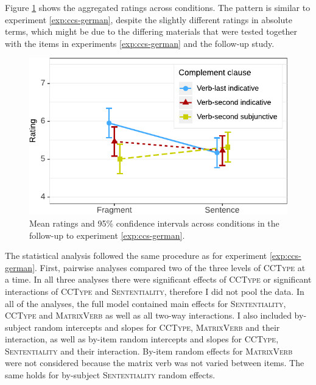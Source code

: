 Figure \ref{fig:ccs-german-short-estimates} shows the aggregated ratings across conditions. The pattern is similar to experiment \ref{exp:ccs-german}, despite the slightly different ratings in absolute terms, which might be due to the differing materials that were tested together with the items in experiments \ref{exp:ccs-german} and the follow-up study.\largerpage[1.75]

\begin{figure}[h]
\includegraphics[scale=1]{figures/ex2b_ccs_de_sc_estimates}
 \caption{Mean ratings and 95\% confidence intervals across conditions in the follow-up to experiment \ref{exp:ccs-german}. \label{fig:ccs-german-short-estimates}}
\end{figure}

The statistical analysis followed the same procedure as for experiment \ref{exp:ccs-german}. First, pairwise analyses compared two of the three levels of \textsc{CCType} at a time. In all three analyses there were significant effects of \textsc{CCType} or significant interactions of \textsc{CCType} and \textsc{Sententiality}, therefore I did not pool the data. In all of the analyses, the full model contained main effects for \textsc{Sententiality}, \textsc{CCType} and \textsc{MatrixVerb} as well as all two-way interactions. I also included by-subject random intercepts and slopes for \textsc{CCType}, \textsc{MatrixVerb} and their interaction, as well as by-item random intercepts and slopes for \textsc{CCType}, \textsc{Sententiality} and their interaction. By-item random effects for \textsc{MatrixVerb} were not considered because the matrix verb was not varied between items. The same holds for by-subject \textsc{Sententiality} random effects.

